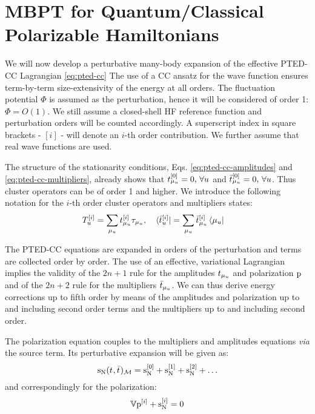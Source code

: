 \section[MBPT for Quantum/Classical Polarizable Hamiltonians]{
MBPT for Quantum/Classical Polarizable Hamiltonians}\label{sec:mbpt-polarizable}

We will now develop a perturbative many-body expansion of the effective
\acrshort{PTED}-\acrshort{CC} Lagrangian \eqref{eq:pted-cc}
The use of a \acrshort{CC} ansatz for the wave function ensures term-by-term
size-extensivity of the energy at all orders.\autocite{Helgaker2000-tz}
The fluctuation potential $\Phi$ is assumed as the perturbation, hence
it will be considered of order 1: $\Phi = O(1)$.
We still assume a closed-shell \acrshort{HF} reference function and
perturbation orders will be counted accordingly.
A superscript index in square brackets - $[i]$ -  will denote an $i$-th
order contribution.
We further assume that real wave functions are used.

The structure of the stationarity conditions,
Eqs. \eqref{eq:pted-cc-amplitudes} and \eqref{eq:pted-cc-multipliers},
already shows that $t_{\mu_u}^{[0]} = 0, \,\forall u$ and
$\bar{t}_{\mu_u}^{[0]} = 0, \, \forall u$.
Thus cluster operators can be of order 1 and higher. We introduce the
following notation for the $i$-th order cluster operators and
multipliers states:
\begin{alignat}{2}
  T_u^{[i]} = \sum_{\mu_u}t_{\mu_u}^{[i]}\tau_{\mu_u},
  \quad&
  \bra{\bar{t}_{u}^{[i]}} = \sum_{\mu_u}\bar{t}_{\mu_u}^{[i]}\bra{\mu_u}
\end{alignat}

The \acrshort{PTED}-\acrshort{CC} equations are expanded in orders of the
perturbation and terms are collected order by order. The use of an
effective, variational Lagrangian implies the validity of the $2n+1$
rule for the amplitudes $t_{\mu_u}$ and polarization $\mathrm{p}$ and of the
$2n+2$ rule for the multipliers $\bar{t}_{\mu_u}$.
We can thus derive energy corrections up to fifth order by means of the
amplitudes and polarization up to and including second order terms and
the multipliers up to and including second order.

The polarization equation couples to the multipliers and amplitudes
equations \emph{via} the source term.
Its perturbative expansion will be given as:
\begin{equation}\label{eq:source-term-pt}
  \mathrm{s}_{\mathrm{N}}(t_{},\bar{t}_{})_\mathcal{M} =
  \mathrm{s}_{\mathrm{N}}^{[0]}
  + \mathrm{s}_{\mathrm{N}}^{[1]}
  + \mathrm{s}_{\mathrm{N}}^{[2]}
  + \ldots
\end{equation}
and correspondingly for the polarization:
\begin{equation}\label{eq:pol-eq-pt}
  \mathbb{V}\mathrm{p}^{[i]} + \mathrm{s}_{\mathrm{N}}^{[i]} = 0
\end{equation}


